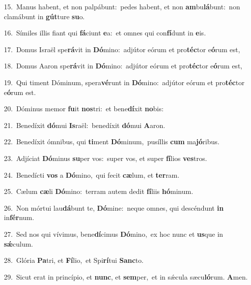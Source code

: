 {\numbfont\textcolor{\numbcolor}{15.}}~Manus habent, et non palpábunt:~\dagger pedes habent, et non \textbf{am}\-bu\-\textbf{lá}\-bunt:~\star non clamábunt in \textbf{gút}\-ture \textbf{su}\-o.\par
{\numbfont\textcolor{\numbcolor}{16.}}~Símiles illis fiant qui \textbf{fá}\-ciunt \textbf{e}\-a:~\star et omnes qui con\-\textbf{fí}\-dunt in \textbf{e}\-is.\par
{\numbfont\textcolor{\numbcolor}{17.}}~Domus Israël spe\-\textbf{rá}\-vit in \textbf{Dó}\-mino:~\star adjútor eórum et pro\-\textbf{téc}\-tor e\-\textbf{ó}\-rum est,\par
{\numbfont\textcolor{\numbcolor}{18.}}~Domus Aaron spe\-\textbf{rá}\-vit in \textbf{Dó}\-mino:~\star adjútor eórum et pro\-\textbf{téc}\-tor e\-\textbf{ó}\-rum est,\par
{\numbfont\textcolor{\numbcolor}{19.}}~Qui timent Dóminum, spera\-\textbf{vé}\-runt in \textbf{Dó}\-mino:~\star adjútor eórum et pro\-\textbf{téc}\-tor e\-\textbf{ó}\-rum est.\par
{\numbfont\textcolor{\numbcolor}{20.}}~Dóminus memor \textbf{fu}\-it \textbf{nos}\-tri:~\star et bene\-\textbf{dí}\-xit \textbf{no}\-bis:\par
{\numbfont\textcolor{\numbcolor}{21.}}~Benedíxit \textbf{dó}\-mui \textbf{Is}\-raël:~\star benedíxit \textbf{dó}\-mui \textbf{A}\-aron.\par
{\numbfont\textcolor{\numbcolor}{22.}}~Benedíxit ómnibus, qui \textbf{ti}\-ment \textbf{Dó}\-minum,~\star pusíllis \textbf{cum} ma\-\textbf{jó}\-ribus.\par
{\numbfont\textcolor{\numbcolor}{23.}}~Adjíciat \textbf{Dó}\-minus \textbf{su}\-per vos:~\star super vos, et super \textbf{fí}\-lios \textbf{ves}\-tros.\par
{\numbfont\textcolor{\numbcolor}{24.}}~Benedícti \textbf{vos} a \textbf{Dó}\-mino,~\star qui fecit \textbf{cæ}\-lum, et \textbf{ter}\-ram.\par
{\numbfont\textcolor{\numbcolor}{25.}}~Cælum \textbf{cæ}\-li \textbf{Dó}\-mino:~\star terram autem dedit \textbf{fí}\-liis \textbf{hó}\-minum.\par
{\numbfont\textcolor{\numbcolor}{26.}}~Non mórtui lau\-\textbf{dá}\-bunt te, \textbf{Dó}\-mine:~\star neque omnes, qui descéndunt \textbf{in} in\-\textbf{fér}\-num.\par
{\numbfont\textcolor{\numbcolor}{27.}}~Sed nos qui vívimus, bene\-\textbf{dí}\-cimus \textbf{Dó}\-mino,~\star ex hoc nunc et \textbf{us}\-que in \textbf{sǽ}\-culum.\par
{\numbfont\textcolor{\numbcolor}{28.}}~Glória \textbf{Pa}\-tri, et \textbf{Fí}\-lio,~\star et Spi\-\textbf{rí}\-tui \textbf{Sanc}\-to.\par
{\numbfont\textcolor{\numbcolor}{29.}}~Sicut erat in princípio, et \textbf{nunc}\-, et \textbf{sem}\-per,~\star et in sǽcula sæcu\-\textbf{ló}\-rum. \textbf{A}\-men.\par
